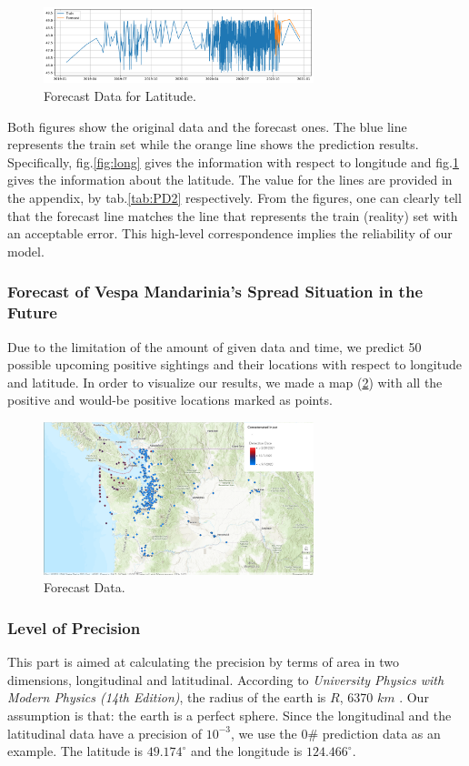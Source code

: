 \documentclass{mcmthesis}
\begin{document}
\begin{figure}[!htbp]
	\centering
 	\includegraphics[width = 0.7\textwidth]{Latitude.png} 
	\caption{Forecast Data for Latitude.}
	\label{fig:lat}
\end{figure}
Both figures show the original data and the forecast ones. The blue line represents the train set while the orange line shows the prediction results. Specifically, fig.\ref{fig:long} gives the information with respect to longitude and fig.\ref{fig:lat} gives the information about the latitude. The value for the lines are provided in the appendix, by tab.\ref{tab:PD2} respectively. From the figures, one can clearly tell that the forecast line matches the line that represents the train (reality) set with an acceptable error. This high-level correspondence implies the reliability of our model.

\subsubsection{Forecast of Vespa Mandarinia's Spread Situation in the Future}
Due to the limitation of the amount of given data and time, we predict 50 possible upcoming positive sightings and their locations with respect to longitude and latitude. 
In order to visualize our results, we made a map (\ref{fig:map}) with all the positive and would-be positive locations marked as points.
\begin{figure}[!htbp]
	\centering
 	\includegraphics[width = 0.7\textwidth]{Concatenated_Visualization.png} 
	\caption{Forecast Data.}
	\label{fig:map}
\end{figure}
\subsubsection{Level of Precision}
This part is aimed at calculating the precision by terms of area in two dimensions, longitudinal and latitudinal. According to \textit{University Physics with Modern Physics (14th Edition)}, the radius of the earth is $R$, 6370 $km$ \cite{RN2}. Our assumption is that: the earth is a perfect sphere. Since the longitudinal and the latitudinal data have a precision of $10^{-3}$, we use the 0\# prediction data as an example. The latitude is $49.174^\circ$ and the longitude is $124.466^\circ$. 
\end{document}

